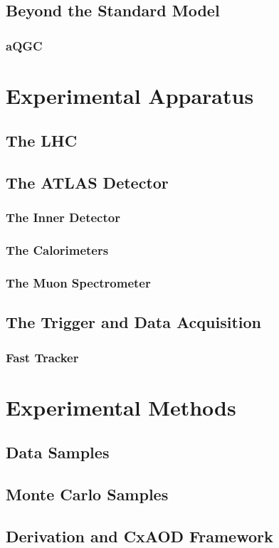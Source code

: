 \documentclass[edeposit,fullpage]{latex/uiucthesis2009}
\begin{document}
\section{Beyond the Standard Model}
\subsection{aQGC}

\chapter{Experimental Apparatus}
\section{The LHC}
\section{The ATLAS Detector}
\subsection{The Inner Detector}
\subsection{The Calorimeters}
\subsection{The Muon Spectrometer}
\section{The Trigger and Data Acquisition}
\subsection{Fast Tracker}

\chapter{Experimental Methods}
\section{Data Samples}
\section{Monte Carlo Samples}
\section{Derivation and CxAOD Framework}
\end{document}
